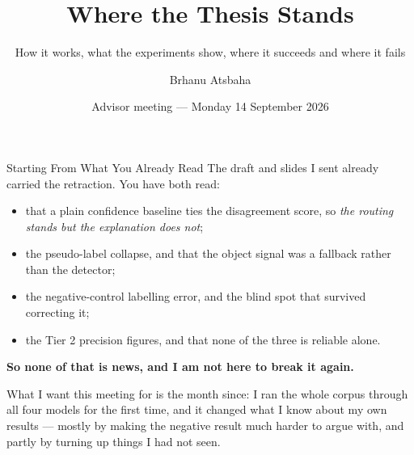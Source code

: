 \documentclass[aspectratio=169,11pt]{beamer}
\title[Advisor Meeting]{Where the Thesis Stands}
\subtitle{\normalsize How it works, what the experiments show, where it succeeds and where it fails}
\author{Brhanu Atsbaha}
\institute{Universität Hildesheim\\[0.15cm]\small \textbf{Advisors:} Prof. Dr. Thomas Mandl \& Shereen Elsayed}
\date{Advisor meeting --- Monday 14 September 2026}
\begin{document}
\maketitle

\begin{frame}{Starting From What You Already Read}
\normalsize
The draft and slides I sent already carried the retraction. You have both read:
\vspace{2mm}
\begin{itemize}\small
  \setlength\itemsep{1mm}
  \item that a plain confidence baseline ties the disagreement score, so \emph{the routing stands but the explanation does not};
  \item the pseudo-label collapse, and that the object signal was a fallback rather than the detector;
  \item the negative-control labelling error, and the blind spot that survived correcting it;
  \item the Tier 2 precision figures, and that none of the three is reliable alone.
\end{itemize}
\vspace{3mm}

\textbf{So none of that is news, and I am not here to break it again.}
\vspace{3mm}

\small What I want this meeting for is the month since: I ran the whole corpus through all four models for the first time, and it changed what I know about my own results --- mostly by making the negative result much harder to argue with, and partly by turning up things I had not seen.
\end{frame}
\end{document}
